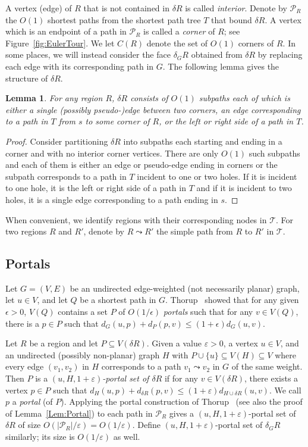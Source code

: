 \documentclass[11pt]{article}
\newtheorem{lemma}{Lemma}
\begin{document}
A vertex (edge) of $R$ that is not contained in $\delta R$ is called \emph{interior}. Denote by $\mathcal P_R$ the $O(1)$ shortest paths from the shortest path tree $T$ that bound $\delta R$. A vertex which is an endpoint of a path in $\mathcal P_R$ is called a \emph{corner} of $R$; see Figure~\ref{fig:EulerTour}. We let $C(R)$ denote the set of $O(1)$ corners of $R$. In some places, we will instead consider the face $\delta_G R$ obtained from $\delta R$ by replacing each edge with its corresponding path in $G$. The following lemma gives the structure of $\delta R$.
\begin{lemma}\label{Lem:deltaR}
For any region $R$, $\delta R$ consists of $O(1)$ subpaths each of which is either a single (possibly pseudo-)edge between two corners, an edge corresponding to a path in $T$ from $s$ to some corner of $R$, or the left or right side of a path in $T$.
\end{lemma}
\begin{proof}
Consider partitioning $\delta R$ into subpaths each starting and ending in a corner and with no interior corner vertices. There are only $O(1)$ such subpaths and each of them is either an edge or pseudo-edge ending in corners or the subpath corresponds to a path in $T$ incident to one or two holes. If it is incident to one hole, it is the left or right side of a path in $T$ and if it is incident to two holes, it is a single edge corresponding to a path ending in $s$.
\end{proof}

When convenient, we identify regions with their corresponding nodes in $\mathcal T$. For two regions $R$ and $R'$, denote by $R\leadsto R'$ the simple path from $R$ to $R'$ in $\mathcal T$.

\subsection{Portals}
Let $G = (V,E)$ be an undirected edge-weighted (not necessarily planar) graph, let $u\in V$, and let $Q$ be a shortest path in $G$. Thorup~\cite{OraclePlanarThorup} showed that for any given $\epsilon > 0$, $V(Q)$ contains a set $P$ of $O(1/\epsilon)$ \emph{portals} such that for any $v\in V(Q)$, there is a $p\in P$ such that $d_G(u,p) + d_P(p,v)\leq (1+\epsilon)d_G(u,v)$.

Let $R$ be a region and let $P\subseteq V(\delta R)$. Given a value $\varepsilon > 0$, a vertex $u\in V$, and an undirected (possibly non-planar) graph $H$ with $P\cup\{u\}\subseteq V(H)\subseteq V$ where every edge $(v_1,v_2)$ in $H$ corresponds to a path $v_1\leadsto v_2$ in $G$ of the same weight. Then $P$ is a \emph{$(u,H,1+\varepsilon)$-portal set of $\delta R$} if for any $v\in V(\delta R)$, there exists a vertex $p\in P$ such that $d_H(u,p) + d_{\delta R}(p,v) \leq (1+\varepsilon)d_{H\cup\delta R}(u,v)$. We call $p$ a \emph{portal} (of $P$). Applying the portal construction of Thorup~\cite{OraclePlanarThorup} (see also the proof of Lemma~\ref{Lem:Portal}) to each path in $\mathcal P_R$ gives a $(u,H,1+\varepsilon)$-portal set of $\delta R$ of size $O(|\mathcal P_R|/\varepsilon) = O(1/\varepsilon)$. Define $(u,H,1+\varepsilon)$-portal set of $\delta_G R$ similarly; its size is $O(1/\varepsilon)$ as well.
\end{document}
